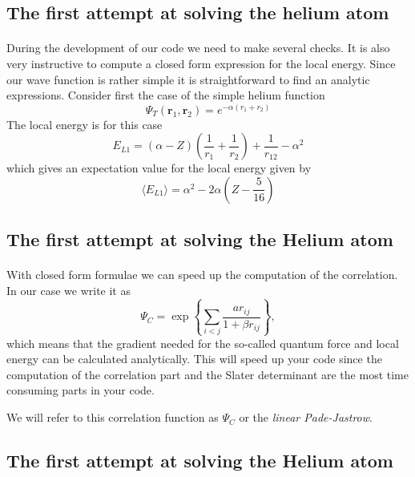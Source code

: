 \documentclass[%
twoside,                 %
final,                   %
10pt]{article}
\begin{document}
\subsection*{The first attempt at solving the helium atom}

\paragraph{}

During the development of our code we need to make several checks. It is also very instructive to compute a closed form expression for the local energy. Since our wave function is rather simple  it is straightforward
to find an analytic expressions.  Consider first the case of the simple helium function 
\[
   \Psi_T(\bm{r}_1,\bm{r}_2) = e^{-\alpha(r_1+r_2)}
\]
The local energy is for this case 
\[ 
E_{L1} = \left(\alpha-Z\right)\left(\frac{1}{r_1}+\frac{1}{r_2}\right)+\frac{1}{r_{12}}-\alpha^2
\]
which gives an expectation value for the local energy given by
\[
\langle E_{L1} \rangle = \alpha^2-2\alpha\left(Z-\frac{5}{16}\right)
\]



\subsection*{The first attempt at solving the Helium atom}

\paragraph{}

With closed form formulae we  can speed up the computation of the correlation. In our case
we write it as 
\[
\Psi_C= \exp{\left\{\sum_{i < j}\frac{ar_{ij}}{1+\beta r_{ij}}\right\}},
\]
which means that the gradient needed for the so-called quantum force and local energy 
can be calculated analytically.
This will speed up your code since the computation of the correlation part and the Slater determinant are the most 
time consuming parts in your code.  

We will refer to this correlation function as $\Psi_C$ or the \emph{linear Pade-Jastrow}.



\subsection*{The first attempt at solving the Helium atom}
\end{document}
